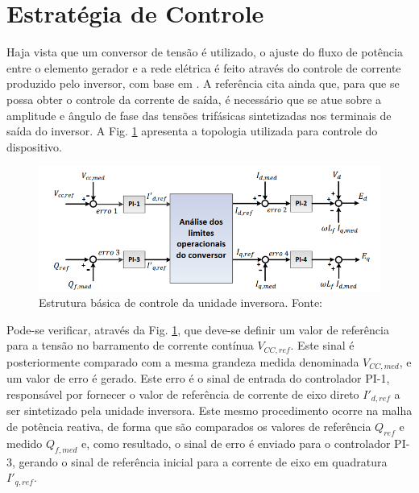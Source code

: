 \section{Estratégia de Controle}

Haja vista que um conversor de tensão é utilizado, o ajuste do fluxo de potência entre o elemento gerador e a rede elétrica é feito através do controle de corrente produzido pelo inversor, com base em \cite{TeseProfAlex}. A referência cita ainda que, para que se possa obter o controle da corrente de saída, é necessário que se atue sobre a amplitude e ângulo de fase das tensões trifásicas sintetizadas nos terminais de saída do inversor. A Fig. \ref{fig:Estrategia-controle-inversor} apresenta a topologia utilizada para controle do dispositivo.

\begin{figure}[!hbt]
	\begin{center}
		\includegraphics[width=\columnwidth]{figuras/Estrategia_Controle_Inversor.PNG}
		\caption{Estrutura básica de controle da unidade inversora. Fonte: \cite{TeseProfAlex}}
		\label{fig:Estrategia-controle-inversor}
	\end{center}
\end{figure}

Pode-se verificar, através da Fig. \ref{fig:Estrategia-controle-inversor}, que deve-se definir um valor de referência para a tensão no barramento de corrente contínua $V_{CC,ref}$. Este sinal é posteriormente comparado com a mesma grandeza medida denominada $V_{CC,med}$, e um valor de erro é gerado. Este erro é o sinal de entrada do controlador PI-1, responsável por fornecer o valor de referência de corrente de eixo direto $I'_{d,ref}$ a ser sintetizado pela unidade inversora. Este mesmo procedimento ocorre na malha de potência reativa, de forma que são comparados os valores de referência $Q_{ref}$ e medido $Q_{f,med}$ e, como resultado, o sinal de erro é enviado para o controlador PI-3, gerando o sinal de referência inicial para a corrente de eixo em quadratura $I'_{q,ref}$.


